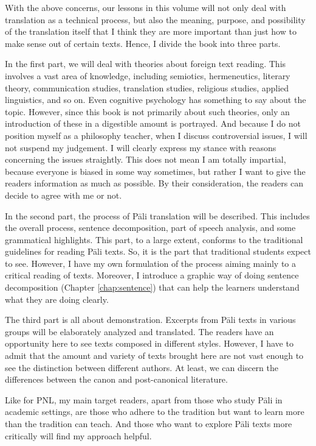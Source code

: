 With the above concerns, our lessons in this volume will not only deal with translation as a technical process, but also the meaning, purpose, and possibility of the translation itself that I think they are more important than just how to make sense out of certain texts. Hence, I divide the book into three parts.

In the first part, we will deal with theories about foreign text reading. This involves a vast area of knowledge, including semiotics, hermeneutics, literary theory, communication studies, translation studies, religious studies, applied linguistics, and so on. Even cognitive psychology has something to say about the topic. However, since this book is not primarily about such theories, only an introduction of these in a digestible amount is portrayed. And because I do not position myself as a philosophy teacher, when I discuss controversial issues, I will not suspend my judgement. I will clearly express my stance with reasons concerning the issues straightly. This does not mean I am totally impartial, because everyone is biased in some way sometimes, but rather I want to give the readers information as much as possible. By their consideration, the readers can decide to agree with me or not.

In the second part, the process of P\=ali translation will be described. This includes the overall process, sentence decomposition, part of speech analysis, and some grammatical highlights. This part, to a large extent, conforms to the traditional guidelines for reading P\=ali texts. So, it is the part that traditional students expect to see. However, I have my own formulation of the process aiming mainly to a critical reading of texts. Moreover, I introduce a graphic way of doing sentence decomposition (Chapter \ref{chap:sentence}) that can help the learners understand what they are doing clearly.

The third part is all about demonstration. Excerpts from P\=ali texts in various groups will be elaborately analyzed and translated. The readers have an opportunity here to see texts composed in different styles. However, I have to admit that the amount and variety of texts brought here are not vast enough to see the distinction between different authors. At least, we can discern the differences between the canon and post-canonical literature.

Like for PNL, my main target readers, apart from those who study P\=ali in academic settings, are those who adhere to the tradition but want to learn more than the tradition can teach. And those who want to explore P\=ali texts more critically will find my approach helpful.

